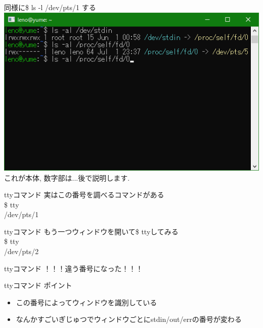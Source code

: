 \documentclass[uplatex, dvipdfmx, unicode]{beamer}
\begin{document}
\begin{frame}
  同様に\$ ls -l /dev/pts/1 する \\
  \vspace{0.2in}
  {
    \centering
    \includegraphics[keepaspectratio, scale=.5]{./img/pts.png} \\
  }
  これが本体, 数字部は...後で説明します.
\end{frame}

\begin{frame}{ttyコマンド}
  実はこの番号を調べるコマンドがある \\
  \vspace{0.2in}
  \$ tty \\
  /dev/pts/1
\end{frame}

\begin{frame}{ttyコマンド}
  もう一つウィンドウを開いて\$ ttyしてみる\\
  \vspace{0.2in}
  \$ tty \\
  /dev/pts/2
\end{frame}

\begin{frame}{ttyコマンド}
  \centering
  \alert{\Huge{！！！違う番号になった！！！}}
\end{frame}

\begin{frame}{ttyコマンド}
  ポイント
  \begin{itemize}
    \item{この番号によってウィンドウを識別している}
    \item{なんかすごいぎじゅつでウィンドウごとにstdin/out/errの番号が変わる}
  \end{itemize}
\end{frame}
\end{document}
